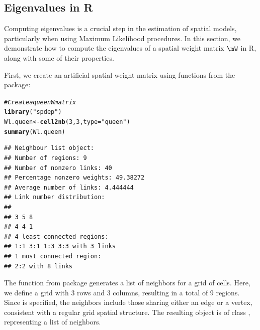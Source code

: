 \documentclass[english,12pt]{book}\usepackage[]{graphicx}\usepackage[]{xcolor}
\makeatletter
\newcommand{\hlnum}[1]{\textcolor[rgb]{0.686,0.059,0.569}{#1}}%
\newcommand{\hlsng}[1]{\textcolor[rgb]{0.192,0.494,0.8}{#1}}%
\newcommand{\hlcom}[1]{\textcolor[rgb]{0.678,0.584,0.686}{\textit{#1}}}%
\newcommand{\hldef}[1]{\textcolor[rgb]{0.345,0.345,0.345}{#1}}%
\newcommand{\hlkwb}[1]{\textcolor[rgb]{0.69,0.353,0.396}{#1}}%
\newcommand{\hlkwc}[1]{\textcolor[rgb]{0.333,0.667,0.333}{#1}}%
\newcommand{\hlkwd}[1]{\textcolor[rgb]{0.737,0.353,0.396}{\textbf{#1}}}%
\newenvironment{kframe}{%
 \def\at@end@of@kframe{}%
 \ifinner\ifhmode%
  \def\at@end@of@kframe{\end{minipage}}%
  \begin{minipage}{\columnwidth}%
 \fi\fi%
 \def\FrameCommand##1{\hskip\@totalleftmargin \hskip-\fboxsep
 \colorbox{shadecolor}{##1}\hskip-\fboxsep
     \hskip-\linewidth \hskip-\@totalleftmargin \hskip\columnwidth}%
 \MakeFramed {\advance\hsize-\width
   \@totalleftmargin\z@ \linewidth\hsize
   \@setminipage}}%
 {\par\unskip\endMakeFramed%
 \at@end@of@kframe}
\newenvironment{knitrout}{}{} %
\makeatother
\begin{document}
\subsection{Eigenvalues in R}

Computing eigenvalues is a crucial step in the estimation of spatial models, particularly when using Maximum Likelihood procedures. In this section, we demonstrate how to compute the eigenvalues of a spatial weight matrix $\mW$ in R, along with some of their properties.

First, we create an artificial spatial weight matrix using functions from the  package:

\begin{knitrout}
\color{fgcolor}\begin{kframe}
\begin{alltt}
\hlcom{# Create a queen W matrix}
\hlkwd{library}\hldef{(}\hlsng{"spdep"}\hldef{)}
\hldef{Wl.queen} \hlkwb{<-} \hlkwd{cell2nb}\hldef{(}\hlnum{3}\hldef{,} \hlnum{3}\hldef{,} \hlkwc{type} \hldef{=} \hlsng{"queen"}\hldef{)}
\hlkwd{summary}\hldef{(Wl.queen)}
\end{alltt}
\begin{verbatim}
## Neighbour list object:
## Number of regions: 9 
## Number of nonzero links: 40 
## Percentage nonzero weights: 49.38272 
## Average number of links: 4.444444 
## Link number distribution:
## 
## 3 5 8 
## 4 4 1 
## 4 least connected regions:
## 1:1 3:1 1:3 3:3 with 3 links
## 1 most connected region:
## 2:2 with 8 links
\end{verbatim}
\end{kframe}
\end{knitrout}

The function  from  package generates a list of neighbors for a grid of cells. Here, we define a grid with 3 rows and 3 columns, resulting in a total of 9 regions. Since  is specified, the neighbors include those sharing either an edge or a vertex, consistent with a regular grid spatial structure. The resulting object is of class , representing a list of neighbors.
\end{document}

